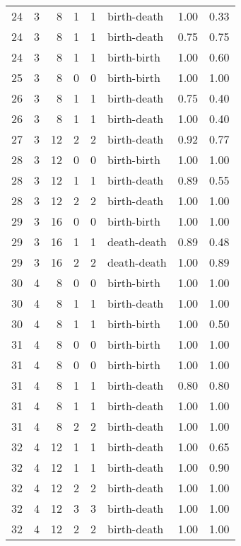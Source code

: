 \documentclass{article}
\begin{document}
\begin{center}
\begin{tabular}{rrrrrlrr}
24 & 3 & 8 & 1 & 1 & birth-death & 1.00 & 0.33 \\
24 & 3 & 8 & 1 & 1 & birth-death & 0.75 & 0.75 \\
24 & 3 & 8 & 1 & 1 & birth-birth & 1.00 & 0.60 \\
25 & 3 & 8 & 0 & 0 & birth-birth & 1.00 & 1.00 \\
26 & 3 & 8 & 1 & 1 & birth-death & 0.75 & 0.40 \\
26 & 3 & 8 & 1 & 1 & birth-death & 1.00 & 0.40 \\
27 & 3 & 12 & 2 & 2 & birth-death & 0.92 & 0.77 \\
28 & 3 & 12 & 0 & 0 & birth-birth & 1.00 & 1.00 \\
28 & 3 & 12 & 1 & 1 & birth-death & 0.89 & 0.55 \\
28 & 3 & 12 & 2 & 2 & birth-death & 1.00 & 1.00 \\
29 & 3 & 16 & 0 & 0 & birth-birth & 1.00 & 1.00 \\
29 & 3 & 16 & 1 & 1 & death-death & 0.89 & 0.48 \\
29 & 3 & 16 & 2 & 2 & death-death & 1.00 & 0.89 \\
30 & 4 & 8 & 0 & 0 & birth-birth & 1.00 & 1.00 \\
30 & 4 & 8 & 1 & 1 & birth-death & 1.00 & 1.00 \\
30 & 4 & 8 & 1 & 1 & birth-birth & 1.00 & 0.50 \\
31 & 4 & 8 & 0 & 0 & birth-birth & 1.00 & 1.00 \\
31 & 4 & 8 & 0 & 0 & birth-birth & 1.00 & 1.00 \\
31 & 4 & 8 & 1 & 1 & birth-death & 0.80 & 0.80 \\
31 & 4 & 8 & 1 & 1 & birth-death & 1.00 & 1.00 \\
31 & 4 & 8 & 2 & 2 & birth-death & 1.00 & 1.00 \\
32 & 4 & 12 & 1 & 1 & birth-death & 1.00 & 0.65 \\
32 & 4 & 12 & 1 & 1 & birth-death & 1.00 & 0.90 \\
32 & 4 & 12 & 2 & 2 & birth-death & 1.00 & 1.00 \\
32 & 4 & 12 & 3 & 3 & birth-death & 1.00 & 1.00 \\
32 & 4 & 12 & 2 & 2 & birth-death & 1.00 & 1.00 \\
\bottomrule
\end{tabular}
\end{center}
\end{document}
